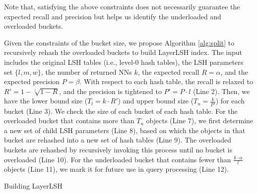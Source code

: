 Note that, satisfying the above constraints does not necessarily guarantee the expected recall and precision but helps us identify the underloaded and overloaded buckets.

Given the constraints of the bucket size, we propose Algorithm \ref{alg:split} to recursively rehash the overloaded buckets to build LayerLSH index. The input includes the original LSH tables (i.e., level-0 hash tables), the LSH parameters set $\{l,m,w\}$, the number of returned NNs $k$, the expected recall $R=\alpha$, and the expected precision $P=\beta$. With respect to each hash table, the recall is relaxed to $R'=1-\sqrt[l]{1-R}$, and the precision is tightened to $P'=P\cdot l$ (Line 2). Then, we have the lower bound size ($T_l=k\cdot R'$) and upper bound size ($T_u=\frac{k}{P'}$) for each bucket (Line 3). We check the size of each bucket of each hash table. For the overloaded bucket that contains more than $T_u$ objects (Line 7), we first determine a new set of child LSH parameters (Line 8), based on which the objects in that bucket are rehashed into a new set of hash tables (Line 9). The overloaded buckets are rehashed by recursively invoking this process until no bucket is overloaded (Line 10). For the underloaded bucket that contains fewer than $\frac{k\cdot\alpha}{l}$ objects (Line 11), we mark it for future use in query processing (Line 12).

\SetAlFnt{\small\sffamily}
\SetInd{0.55em}{0.5em}
\setlength{\textfloatsep}{0pt}
\begin{algorithm}[t]
\SetNoFillComment
{}

\BlankLine
{}
\caption{Building LayerLSH}
\label{alg:split}
\end{algorithm}


